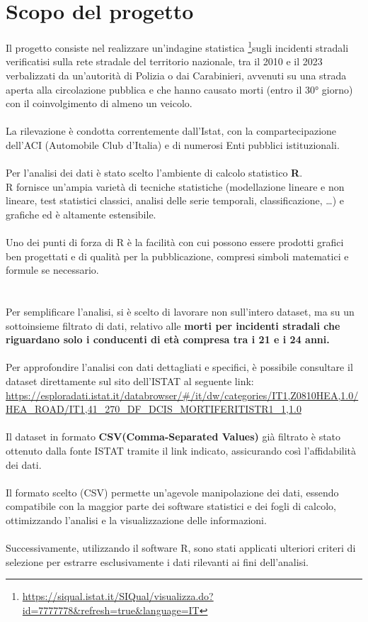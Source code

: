 \documentclass[14pt, openany, titlepage]{report} %
\begin{document}
\section{Scopo del progetto}
Il progetto consiste nel realizzare un’indagine statistica \footnote{\url{https://siqual.istat.it/SIQual/visualizza.do?id=7777778&refresh=true&language=IT}}sugli incidenti stradali verificatisi sulla rete stradale del territorio nazionale, tra il 2010 e il 2023 verbalizzati da un'autorità di Polizia o dai Carabinieri, 
avvenuti su una strada aperta alla circolazione pubblica e che hanno causato morti (entro il 30° giorno) con il coinvolgimento 
di almeno un veicolo. \\\\
\noindent
La rilevazione è condotta correntemente dall’Istat, con la compartecipazione dell'ACI (Automobile Club d'Italia) e di numerosi Enti pubblici istituzionali. \\\\
\noindent
Per l'analisi dei dati è stato scelto l'ambiente di calcolo statistico \textbf{R}. \\
R fornisce un'ampia varietà di tecniche statistiche (modellazione lineare e non lineare, test statistici classici, analisi delle serie temporali, classificazione, \dots)
e grafiche ed è altamente estensibile.\\\\
\noindent
Uno dei punti di forza di R è la facilità con cui possono essere prodotti grafici ben progettati e di qualità per la pubblicazione, 
compresi simboli matematici e formule se necessario.\\\\\\
\noindent
Per semplificare l'analisi, si è scelto di lavorare non sull'intero dataset, 
ma su un sottoinsieme filtrato di dati, relativo alle \textbf{morti per incidenti stradali che riguardano solo i conducenti di età compresa tra i 21 e i 24 anni.}\\\\
\noindent
Per approfondire l'analisi con dati dettagliati e specifici, è possibile consultare il dataset direttamente sul sito dell'ISTAT al seguente link:
\url{https://esploradati.istat.it/databrowser/#/it/dw/categories/IT1,Z0810HEA,1.0/HEA_ROAD/IT1,41_270_DF_DCIS_MORTIFERITISTR1_1,1.0}\\\\
\noindent
Il dataset in formato \textbf{CSV(Comma-Separated Values)} già filtrato è stato ottenuto dalla fonte ISTAT tramite il link indicato, assicurando così l'affidabilità dei dati.\\\\
Il formato scelto (CSV) permette un'agevole manipolazione dei dati, essendo compatibile con la maggior parte dei software statistici e
dei fogli di calcolo, ottimizzando l'analisi e la visualizzazione delle informazioni.\\\\
\noindent
Successivamente, utilizzando il software R, sono stati applicati
 ulteriori criteri di selezione per estrarre esclusivamente i dati 
 rilevanti ai fini dell’analisi.\\
\end{document}
